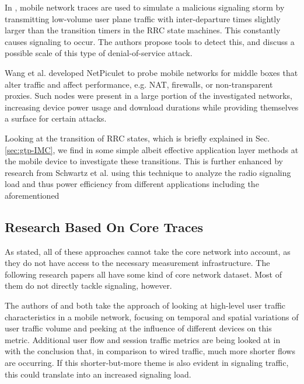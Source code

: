 In \cite{lee2007detection}, mobile network traces are used to simulate a malicious signaling storm by transmitting low-volume user plane traffic with inter-departure times slightly larger than the transition timers in the \ac{RRC} state machines. This constantly causes signaling to occur. The authors propose tools to detect this, and discuss a possible scale of this type of denial-of-service attack.
 
Wang et al.\cite{wang2011untold} developed NetPiculet to probe mobile networks for middle boxes that alter traffic and affect performance, e.g. NAT, firewalls, or non-transparent proxies. Such nodes were present in a large portion of the investigated networks, increasing device power usage and download durations while providing themselves a surface for certain attacks.

Looking at the transition of \ac{RRC} states, which is briefly explained in Sec. \ref{sec:gtp-IMC}, we find in \cite{5360763} some simple albeit effective application layer methods at the mobile device to investigate these transitions. This is further enhanced by research from Schwartz et al.\cite{schwartz2013angrybirds} using this technique to analyze the radio signaling load and thus power efficiency from different applications including the aforementioned


\subsection{Research Based On Core Traces}

As stated, all of these approaches cannot take the core network into account, as they do not have access to the necessary measurement infrastructure. The following research papers all have some kind of core network dataset. Most of them do not directly tackle signaling, however.

The authors of \cite{shafiq2011characterizing} and \cite{paul2011understanding} both take the approach of looking at high-level user traffic characteristics in a mobile network, focusing on temporal and spatial variations of user traffic volume and peeking at the influence of different devices on this metric. Additional user flow and session traffic metrics are being looked at in \cite{Zhang:2012:UCC:2377677.2377764} with the conclusion that, in comparison to wired traffic, much more shorter flows are occurring. If this shorter-but-more theme is also evident in signaling traffic, this could translate into an increased signaling load.

